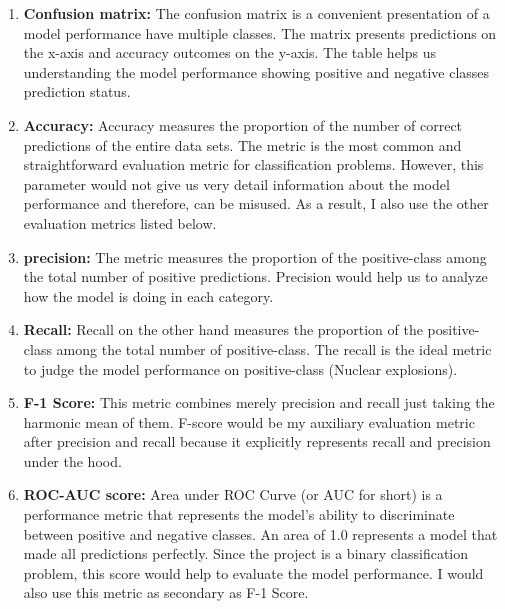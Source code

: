 \documentclass[12pt]{article}
\begin{document}
        \begin{enumerate}
    
            \item \textbf{Confusion matrix:} The confusion matrix is a convenient presentation of a model performance have multiple classes. The matrix presents predictions on the x-axis and accuracy outcomes on the y-axis. The table helps us understanding the model performance showing positive and negative classes prediction status. 
            
            \item \textbf{Accuracy:} Accuracy measures the proportion of the number of correct predictions of the entire data sets. The metric is the most common and straightforward evaluation metric for classification problems. However, this parameter would not give us very detail information about the model performance and therefore,  can be misused. As a result, I also use the other evaluation metrics listed below.
    
            \item \textbf{precision:} The metric measures the proportion of the positive-class among the total number of positive predictions. Precision would help us to analyze how the model is doing in each category.
            
            \item \textbf{Recall:} Recall on the other hand measures the proportion of the positive-class among the total number of positive-class. The recall is the ideal metric to judge the model performance on positive-class (Nuclear explosions).
            
            \item \textbf{F-1 Score:} This metric combines merely precision and recall just taking the harmonic mean of them. F-score would be my auxiliary evaluation metric after precision and recall because it explicitly represents recall and precision under the hood.
    
            \item \textbf{ROC-AUC score:} Area under ROC Curve (or AUC for short) is a performance metric that represents the model’s ability to discriminate between positive and negative classes. An area of 1.0 represents a model that made all predictions perfectly. Since the project is a binary classification problem, this score would help to evaluate the model performance. I would also use this metric as secondary as F-1 Score. 
        
        \end{enumerate}
        
\end{document}
